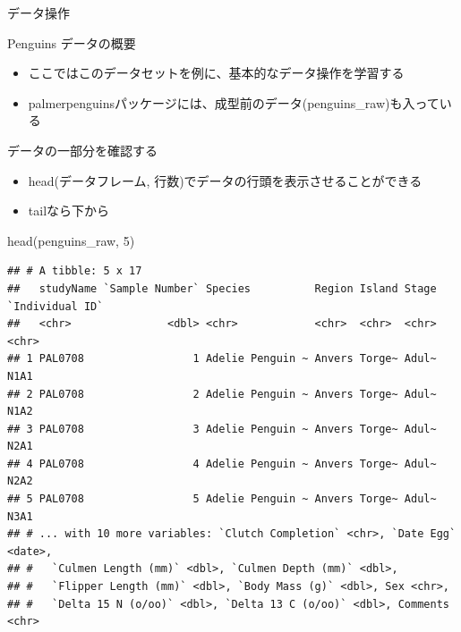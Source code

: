 \documentclass[
  ignorenonframetext,
]{beamer}
\newenvironment{Shaded}{\begin{snugshade}}{\end{snugshade}}
\newcommand{\DecValTok}[1]{\textcolor[rgb]{0.00,0.00,0.81}{#1}}
\newcommand{\FunctionTok}[1]{\textcolor[rgb]{0.00,0.00,0.00}{#1}}
\newcommand{\NormalTok}[1]{#1}
\providecommand{\tightlist}{%
  \setlength{\itemsep}{0pt}\setlength{\parskip}{0pt}}
\begin{document}
\begin{frame}[fragile]{データ操作}
\begin{block}{Penguins データの概要}
\begin{itemize}
  \begin{itemize}
  \tightlist
  \item
    Gorman KB, Williams TD, Fraser WR (2014) Ecological Sexual
    Dimorphism and Environmental Variability within a Community of
    Antarctic Penguins (Genus Pygoscelis). PLoS ONE 9(3): e90081.
    {[}\url{https://doi.org/10.1371/journal.pone.0090081}{]}
  \item
    著者名、公刊年度、タイトル、学術誌名、その他(URLなど)の順で記載するのが一般的
  \item
    ``Cite''
    みたいなボタンを押すと簡単にフォーマットをコピーできることが多いです
  \end{itemize}
\item
  ここではこのデータセットを例に、基本的なデータ操作を学習する
\item
  palmerpenguinsパッケージには、成型前のデータ(penguins\_raw)も入っている
\end{itemize}
\end{block}

\begin{block}{データの一部分を確認する}
\protect\hypertarget{ux30c7ux30fcux30bfux306eux4e00ux90e8ux5206ux3092ux78baux8a8dux3059ux308b}{}
\begin{itemize}
\tightlist
\item
  head(データフレーム, 行数)でデータの行頭を表示させることができる
\item
  tailなら下から
\end{itemize}

\begin{Shaded}
\begin{Highlighting}[]
\FunctionTok{head}\NormalTok{(penguins\_raw, }\DecValTok{5}\NormalTok{)}
\end{Highlighting}
\end{Shaded}

\begin{verbatim}
## # A tibble: 5 x 17
##   studyName `Sample Number` Species          Region Island Stage `Individual ID`
##   <chr>               <dbl> <chr>            <chr>  <chr>  <chr> <chr>          
## 1 PAL0708                 1 Adelie Penguin ~ Anvers Torge~ Adul~ N1A1           
## 2 PAL0708                 2 Adelie Penguin ~ Anvers Torge~ Adul~ N1A2           
## 3 PAL0708                 3 Adelie Penguin ~ Anvers Torge~ Adul~ N2A1           
## 4 PAL0708                 4 Adelie Penguin ~ Anvers Torge~ Adul~ N2A2           
## 5 PAL0708                 5 Adelie Penguin ~ Anvers Torge~ Adul~ N3A1           
## # ... with 10 more variables: `Clutch Completion` <chr>, `Date Egg` <date>,
## #   `Culmen Length (mm)` <dbl>, `Culmen Depth (mm)` <dbl>,
## #   `Flipper Length (mm)` <dbl>, `Body Mass (g)` <dbl>, Sex <chr>,
## #   `Delta 15 N (o/oo)` <dbl>, `Delta 13 C (o/oo)` <dbl>, Comments <chr>
\end{verbatim}


\end{block}
\end{frame}
\end{document}
